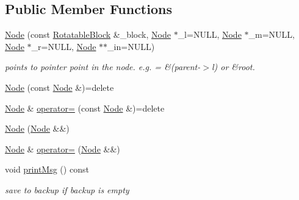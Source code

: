 \subsection*{Public Member Functions}
\begin{DoxyCompactItemize}
\item 
\hyperlink{classTTree_1_1Node_a73f229145664a7b5ce0c41746ba4e881}{Node} (const \hyperlink{structRotatableBlock}{Rotatable\+Block} \&\+\_\+block, \hyperlink{classTTree_1_1Node}{Node} $\ast$\+\_\+l=N\+U\+L\+L, \hyperlink{classTTree_1_1Node}{Node} $\ast$\+\_\+m=N\+U\+L\+L, \hyperlink{classTTree_1_1Node}{Node} $\ast$\+\_\+r=N\+U\+L\+L, \hyperlink{classTTree_1_1Node}{Node} $\ast$$\ast$\+\_\+in=N\+U\+L\+L)
\begin{DoxyCompactList}\small\item\em points to pointer point in the node. e.\+g. = \&(parent-\/$>$l) or \&root. \end{DoxyCompactList}\item 
\hyperlink{classTTree_1_1Node_a6b9ce78ca08f3648379cf135d6796092}{Node} (const \hyperlink{classTTree_1_1Node}{Node} \&)=delete
\item 
\hyperlink{classTTree_1_1Node}{Node} \& \hyperlink{classTTree_1_1Node_a20ffdb80255bcabcdff42201b961869e}{operator=} (const \hyperlink{classTTree_1_1Node}{Node} \&)=delete
\item 
\hyperlink{classTTree_1_1Node_a78c5f48ae1323abc4b9186f1b7e89dd1}{Node} (\hyperlink{classTTree_1_1Node}{Node} \&\&)
\item 
\hyperlink{classTTree_1_1Node}{Node} \& \hyperlink{classTTree_1_1Node_aa3c96d0cacc8d285aee7290a257077b1}{operator=} (\hyperlink{classTTree_1_1Node}{Node} \&\&)
\item 
void \hyperlink{classTTree_1_1Node_a6d989c4974f820a288dcf18cad3e8ed1}{print\+Msg} () const 
\begin{DoxyCompactList}\small\item\em save to backup if backup is empty \end{DoxyCompactList}\end{DoxyCompactItemize}
